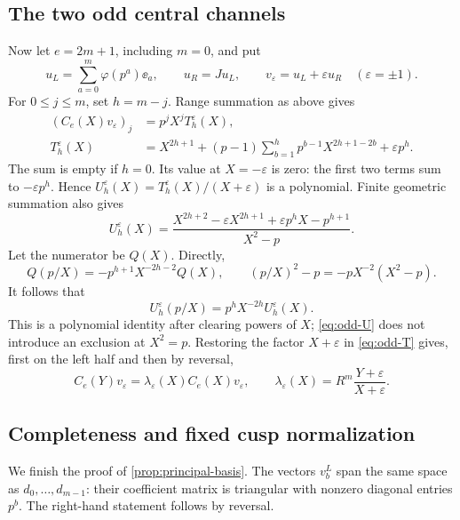 \subsection{The two odd central channels}

Now let \(e=2m+1\), including \(m=0\), and put
\begin{equation}\label{eq:odd-vectors}
 u_L=\sum_{a=0}^m\varphi(p^a)\ee_a,\qquad
 u_R=Ju_L,\qquad v_\varepsilon=u_L+\varepsilon u_R
 \quad(\varepsilon=\pm1).
\end{equation}
For \(0\le j\le m\), set \(h=m-j\). Range summation as above gives
\begin{align}
 (C_e(X)v_\varepsilon)_j&=p^jX^jT_h^\varepsilon(X),
 \label{eq:odd-T}\\
 T_h^\varepsilon(X)&=
 X^{2h+1}+(p-1)\sum_{b=1}^h p^{b-1}X^{2h+1-2b}
       +\varepsilon p^h. \nonumber
\end{align}
The sum is empty if \(h=0\). Its value at \(X=-\varepsilon\) is
zero: the first two terms sum to \(-\varepsilon p^h\). Hence
\(U_h^\varepsilon(X)=T_h^\varepsilon(X)/(X+\varepsilon)\)
is a polynomial. Finite geometric summation also gives
\begin{equation}\label{eq:odd-U}
 U_h^\varepsilon(X)=
 \frac{X^{2h+2}-\varepsilon X^{2h+1}
       +\varepsilon p^hX-p^{h+1}}{X^2-p}.
\end{equation}
Let the numerator be \(Q(X)\). Directly,
\[
 Q(p/X)=-p^{h+1}X^{-2h-2}Q(X),\qquad
 (p/X)^2-p=-pX^{-2}(X^2-p).
\]
It follows that
\[
 U_h^\varepsilon(p/X)=p^hX^{-2h}U_h^\varepsilon(X).
\]
This is a polynomial identity after clearing powers of \(X\);
\eqref{eq:odd-U} does not introduce an exclusion at \(X^2=p\).
Restoring the factor \(X+\varepsilon\) in
\eqref{eq:odd-T} gives, first on the left half and then by reversal,
\begin{equation}\label{eq:central-eigenvalues}
 C_e(Y)v_\varepsilon
 =\lambda_\varepsilon(X)C_e(X)v_\varepsilon,\qquad
 \lambda_\varepsilon(X)=R^m\frac{Y+\varepsilon}{X+\varepsilon}.
\end{equation}

\subsection{Completeness and fixed cusp normalization}

We finish the proof of \cref{prop:principal-basis}.
The vectors \(v_b^L\) span the same space as
\(d_0,\ldots,d_{m-1}\): their coefficient matrix is triangular with
nonzero diagonal entries \(p^b\). The right-hand statement follows
by reversal.

